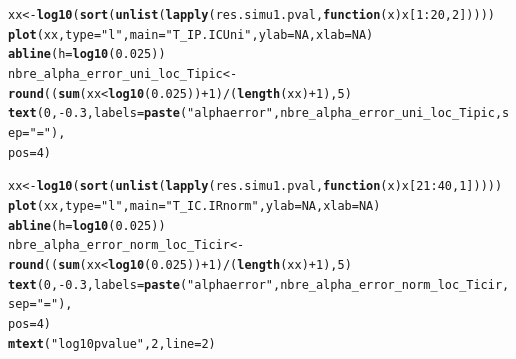 \documentclass[12pt]{article}\usepackage[]{graphicx}\usepackage[]{color}
\makeatletter
\newcommand{\hlnum}[1]{\textcolor[rgb]{0.686,0.059,0.569}{#1}}%
\newcommand{\hlstr}[1]{\textcolor[rgb]{0.192,0.494,0.8}{#1}}%
\newcommand{\hlopt}[1]{\textcolor[rgb]{0,0,0}{#1}}%
\newcommand{\hlstd}[1]{\textcolor[rgb]{0.345,0.345,0.345}{#1}}%
\newcommand{\hlkwa}[1]{\textcolor[rgb]{0.161,0.373,0.58}{\textbf{#1}}}%
\newcommand{\hlkwb}[1]{\textcolor[rgb]{0.69,0.353,0.396}{#1}}%
\newcommand{\hlkwc}[1]{\textcolor[rgb]{0.333,0.667,0.333}{#1}}%
\newcommand{\hlkwd}[1]{\textcolor[rgb]{0.737,0.353,0.396}{\textbf{#1}}}%
\newenvironment{kframe}{%
 \def\at@end@of@kframe{}%
 \ifinner\ifhmode%
  \def\at@end@of@kframe{\end{minipage}}%
  \begin{minipage}{\columnwidth}%
 \fi\fi%
 \def\FrameCommand##1{\hskip\@totalleftmargin \hskip-\fboxsep
 \colorbox{shadecolor}{##1}\hskip-\fboxsep
     \hskip-\linewidth \hskip-\@totalleftmargin \hskip\columnwidth}%
 \MakeFramed {\advance\hsize-\width
   \@totalleftmargin\z@ \linewidth\hsize
   \@setminipage}}%
 {\par\unskip\endMakeFramed%
 \at@end@of@kframe}
\newenvironment{knitrout}{}{} %
\makeatother
\begin{document}
\begin{knitrout}
\begin{kframe}
\begin{alltt}
\hlstd{xx} \hlkwb{<-} \hlkwd{log10}\hlstd{(}\hlkwd{sort}\hlstd{(}\hlkwd{unlist}\hlstd{(}\hlkwd{lapply}\hlstd{(res.simu1.pval,} \hlkwa{function}\hlstd{(}\hlkwc{x}\hlstd{) x[}\hlnum{1}\hlopt{:}\hlnum{20}\hlstd{,} \hlnum{2}\hlstd{]))))}
\hlkwd{plot}\hlstd{(xx,} \hlkwc{type} \hlstd{=} \hlstr{"l"}\hlstd{,} \hlkwc{main} \hlstd{=} \hlstr{"T_IP.IC Uni"}\hlstd{,} \hlkwc{ylab} \hlstd{=} \hlnum{NA}\hlstd{,} \hlkwc{xlab} \hlstd{=} \hlnum{NA}\hlstd{)}
\hlkwd{abline}\hlstd{(}\hlkwc{h} \hlstd{=} \hlkwd{log10}\hlstd{(}\hlnum{0.025}\hlstd{))}
\hlstd{nbre_alpha_error_uni_loc_Tipic} \hlkwb{<-} \hlkwd{round}\hlstd{((}\hlkwd{sum}\hlstd{(xx} \hlopt{<} \hlkwd{log10}\hlstd{(}\hlnum{0.025}\hlstd{))} \hlopt{+}\hlnum{1} \hlstd{)} \hlopt{/} \hlstd{(}\hlkwd{length}\hlstd{(xx)}\hlopt{+}\hlnum{1}\hlstd{),} \hlnum{5}\hlstd{)}
\hlkwd{text}\hlstd{(}\hlnum{0}\hlstd{,} \hlopt{-}\hlnum{0.3}\hlstd{,} \hlkwc{labels} \hlstd{=} \hlkwd{paste}\hlstd{(}\hlstr{"alpha error"}\hlstd{, nbre_alpha_error_uni_loc_Tipic,} \hlkwc{sep} \hlstd{=} \hlstr{" = "}\hlstd{),}
     \hlkwc{pos} \hlstd{=} \hlnum{4}\hlstd{)}

\hlstd{xx} \hlkwb{<-} \hlkwd{log10}\hlstd{(}\hlkwd{sort}\hlstd{(}\hlkwd{unlist}\hlstd{(}\hlkwd{lapply}\hlstd{(res.simu1.pval,} \hlkwa{function}\hlstd{(}\hlkwc{x}\hlstd{) x[}\hlnum{21}\hlopt{:}\hlnum{40}\hlstd{,} \hlnum{1}\hlstd{]))))}
\hlkwd{plot}\hlstd{(xx,} \hlkwc{type} \hlstd{=} \hlstr{"l"}\hlstd{,} \hlkwc{main} \hlstd{=} \hlstr{"T_IC.IR norm"}\hlstd{,} \hlkwc{ylab} \hlstd{=} \hlnum{NA}\hlstd{,} \hlkwc{xlab} \hlstd{=} \hlnum{NA}\hlstd{)}
\hlkwd{abline}\hlstd{(}\hlkwc{h} \hlstd{=} \hlkwd{log10}\hlstd{(}\hlnum{0.025}\hlstd{))}
\hlstd{nbre_alpha_error_norm_loc_Ticir} \hlkwb{<-} \hlkwd{round}\hlstd{((}\hlkwd{sum}\hlstd{(xx} \hlopt{<} \hlkwd{log10}\hlstd{(}\hlnum{0.025}\hlstd{))} \hlopt{+}\hlnum{1} \hlstd{)} \hlopt{/} \hlstd{(}\hlkwd{length}\hlstd{(xx)}\hlopt{+}\hlnum{1}\hlstd{),} \hlnum{5}\hlstd{)}
\hlkwd{text}\hlstd{(}\hlnum{0}\hlstd{,} \hlopt{-}\hlnum{0.3}\hlstd{,} \hlkwc{labels} \hlstd{=} \hlkwd{paste}\hlstd{(}\hlstr{"alpha error"}\hlstd{, nbre_alpha_error_norm_loc_Ticir,} \hlkwc{sep} \hlstd{=} \hlstr{" = "}\hlstd{),}
     \hlkwc{pos} \hlstd{=} \hlnum{4}\hlstd{)}
\hlkwd{mtext}\hlstd{(}\hlstr{"log10 pvalue"}\hlstd{,} \hlnum{2}\hlstd{,} \hlkwc{line} \hlstd{=} \hlnum{2}\hlstd{)}


\end{alltt}
\end{kframe}
\end{knitrout}
\end{document}
